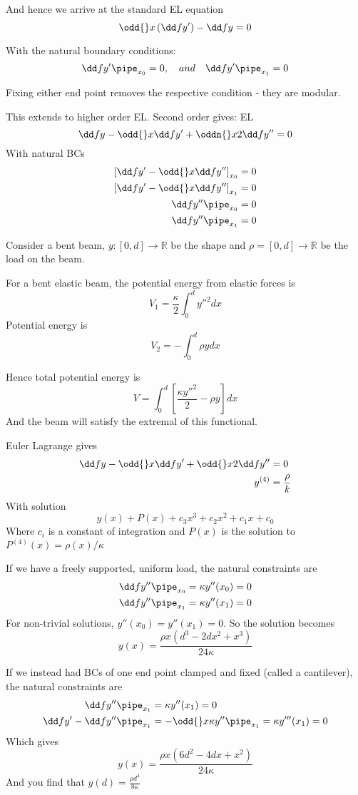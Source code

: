 \documentclass{E:/Documents/Latex/myassignment}
\begin{document}
And hence we arrive at the standard EL equation
\[\odd{}x \left(\dd f{y'}\right) - \dd fy = 0\]

With the natural boundary conditions:
\[\dd f{y'}\pipe_{x_0} = 0, \quad and \quad \dd f{y'}\pipe_{x_1} = 0\]

Fixing either end point removes the respective condition - they are modular.


This extends to higher order EL. Second order gives:
EL
\[\dd fy - \odd{}x \dd f{y'} + \oddn{}x2 \dd fy{''} = 0\]
With natural BCs
\begin{align*}
	\left[\dd f{y'} - \odd{}x \dd f{y''}\right]_{x_0} = 0\\
	\left[\dd f{y'} - \odd{}x \dd f{y''}\right]_{x_1} = 0\\
	\dd f{y''}\pipe_{x_0} =0\\
	\dd f{y''}\pipe_{x_1} =0 
\end{align*}


Consider a bent beam, $y : [0,d] \to \mathbb{R}$ be the shape and $\rho = [0,d] \to \mathbb{R}$ be the load on the beam.

For a bent elastic beam, the potential energy from elastic forces is
\[V_1 = \frac \kappa 2 \int_0^d y''^2 dx\]
Potential energy is
\[V_2 = -\int_0^d \rho y dx\]

Hence total potential energy is
\[V = \int_0^d \left[\frac{\kappa y''^2}{2} - \rho y\right] dx\]
And the beam will satisfy the extremal of this functional.

Euler Lagrange gives
\begin{align*}
	\dd fy - \odd{}x \dd f{y'} + \odd{}x2 \dd f{y''} &=0\\
	y^{(4)} &= \frac{\rho}{k}
\end{align*}
With solution
\[y(x) + P(x) + c_3 x^3 + c_2x^2 + c_1 x + c_0\]
Where $c_i$ is a constant of integration and $P(x)$ is the solution to $P^{(4)}(x) = \rho(x)/\kappa$

If we have a freely supported, uniform load, the natural constraints are
\begin{align*}
	\dd f{y''}\pipe_{x_0} &= \kappa y''(x_0) = 0\\
	\dd f{y''}\pipe_{x_1} &= \kappa y''(x_1) = 0\\
\end{align*}
For non-trivial solutions, $y''(x_0) = y''(x_1) = 0$.
So the solution becomes
\[y(x) = \frac{\rho x \left(d^3 - 2dx^2 + x^3\right)}{24 \kappa}\]


If we instead had BCs of one end point clamped and fixed (called a cantilever), the natural constraints are
\begin{align*}
	\dd f{y''}\pipe_{x_1} &= \kappa y''(x_1) = 0\\
	\dd f{y'} - \dd f{y''}\pipe_{x_1} &= - \odd{}x \kappa y'' \pipe_{x_1} = \kappa y'''(x_1) = 0\\
\end{align*}
Which gives
\[y(x) = \frac{\rho x (6 d^2 - 4dx + x^2)}{24 \kappa}\]
And you find that $y(d) = \frac{\rho d^4}{8 \kappa}$
\end{document}
